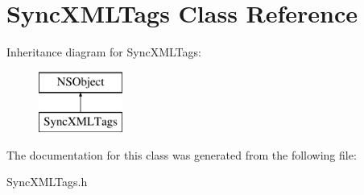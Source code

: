 \hypertarget{interface_sync_x_m_l_tags}{
\section{\-Sync\-X\-M\-L\-Tags \-Class \-Reference}
\label{interface_sync_x_m_l_tags}
}
\-Inheritance diagram for \-Sync\-X\-M\-L\-Tags\-:\begin{figure}[H]
\begin{center}
\leavevmode
\includegraphics[height=2.000000cm]{interface_sync_x_m_l_tags}
\end{center}
\end{figure}


\-The documentation for this class was generated from the following file\-:\begin{DoxyCompactItemize}
\item 
\-Sync\-X\-M\-L\-Tags.\-h\end{DoxyCompactItemize}
